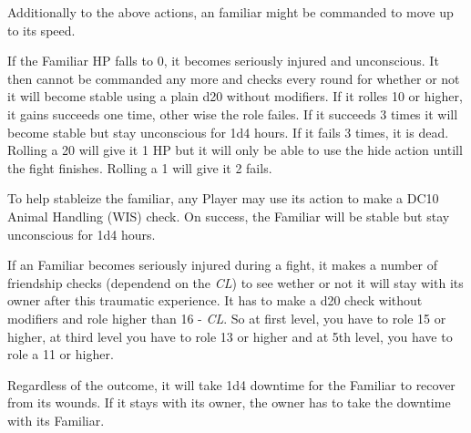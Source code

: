 Additionally to the above actions, an familiar might be commanded to move up to its speed.

If the Familiar HP falls to 0, it becomes seriously injured and unconscious. It then cannot be commanded any more and checks every round for whether or not it will become stable using a plain d20 without modifiers. If it rolles 10 or higher, it gains succeeds one time, other wise the role failes. If it succeeds 3 times it will become stable but stay unconscious for 1d4 hours. If it fails 3 times, it is dead. Rolling a 20 will give it 1 HP but it will only be able to use the hide action untill the fight finishes. Rolling a 1 will give it 2 fails.

To help stableize the familiar, any Player may use its action to make a DC10 Animal Handling (WIS) check. On success, the Familiar will be stable but stay unconscious for 1d4 hours.

If an Familiar becomes seriously injured during a fight, it makes a number of friendship checks (dependend on the \textit{CL}) to see wether or not it will stay with its owner after this traumatic experience. It has to make a d20 check without modifiers and role higher than 16 - \textit{CL}. So at first level, you have to role 15 or higher, at third level you have to role 13 or higher and at 5th level, you have to role a 11 or higher.

Regardless of the outcome, it will take 1d4 downtime for the Familiar to recover from its wounds. If it stays with its owner, the owner has to take the downtime with its Familiar.

